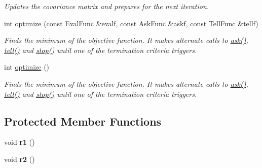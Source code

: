 \begin{DoxyCompactItemize}
\begin{DoxyCompactList}\small\item\em Updates the covariance matrix and prepares for the next iteration. \end{DoxyCompactList}\item 
int \hyperlink{classlibcmaes_1_1BIPOPCMAStrategy_a8646acea54a5e3775a040aa43fb6804c}{optimize} (const Eval\-Func \&evalf, const Ask\-Func \&askf, const Tell\-Func \&tellf)
\begin{DoxyCompactList}\small\item\em Finds the minimum of the objective function. It makes alternate calls to \hyperlink{classlibcmaes_1_1CMAStrategy_ab7266bc50732458ffcab690bc26380e6}{ask()}, \hyperlink{classlibcmaes_1_1BIPOPCMAStrategy_adc3f5ef544a151efeb96e4d4c83e1858}{tell()} and \hyperlink{classlibcmaes_1_1CMAStrategy_adc87b9c500959c800b6bc93d89432ecc}{stop()} until one of the termination criteria triggers. \end{DoxyCompactList}\item 
int \hyperlink{classlibcmaes_1_1BIPOPCMAStrategy_a7117a7300899d1b3b734ffc6efd41054}{optimize} ()
\begin{DoxyCompactList}\small\item\em Finds the minimum of the objective function. It makes alternate calls to \hyperlink{classlibcmaes_1_1CMAStrategy_ab7266bc50732458ffcab690bc26380e6}{ask()}, \hyperlink{classlibcmaes_1_1BIPOPCMAStrategy_adc3f5ef544a151efeb96e4d4c83e1858}{tell()} and \hyperlink{classlibcmaes_1_1CMAStrategy_adc87b9c500959c800b6bc93d89432ecc}{stop()} until one of the termination criteria triggers. \end{DoxyCompactList}\end{DoxyCompactItemize}
\subsection*{Protected Member Functions}
\begin{DoxyCompactItemize}
\item 
\hypertarget{classlibcmaes_1_1BIPOPCMAStrategy_a7285772ab91aa5da1bbb20485ed6136d}{void {\bfseries r1} ()}\label{classlibcmaes_1_1BIPOPCMAStrategy_a7285772ab91aa5da1bbb20485ed6136d}

\item 
\hypertarget{classlibcmaes_1_1BIPOPCMAStrategy_a1bf830b35350a9c9d63dd717dfab7c73}{void {\bfseries r2} ()}\label{classlibcmaes_1_1BIPOPCMAStrategy_a1bf830b35350a9c9d63dd717dfab7c73}

\end{DoxyCompactItemize}
